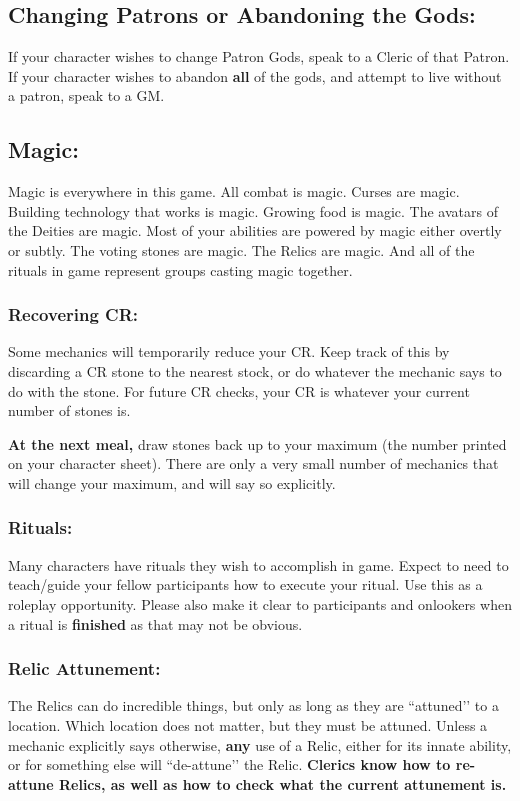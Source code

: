 \documentclass[sheet]{GL2020}
\begin{document}
\subsection{Changing Patrons or Abandoning the Gods:}
If your character wishes to change Patron Gods, speak to a Cleric of that Patron. If your character wishes to abandon \textbf{all} of the gods, and attempt to live without a patron, speak to a GM.

\subsection{Magic:}
{Magic is everywhere in this game. All combat is magic. Curses are magic. Building technology that works is magic. Growing food is magic. The avatars of the Deities are magic. Most of your abilities are powered by magic either overtly or subtly. The voting stones are magic. The Relics are magic. And all of the rituals in game represent groups casting magic together.

\subsubsection{Recovering CR:}
Some mechanics will temporarily reduce your CR. Keep track of this by discarding a CR stone to the nearest stock, or do whatever the mechanic says to do with the stone. For future CR checks, your CR is whatever your current number of stones is.

\textbf{At the next meal,} draw stones back up to your maximum (the number printed on your character sheet). There are only a very small number of mechanics that will change your maximum, and will say so explicitly.

\subsubsection{Rituals:}
Many characters have rituals they wish to accomplish in game. Expect to need to teach/guide your fellow participants how to execute your ritual. Use this as a roleplay opportunity. Please also make it clear to participants and onlookers when a ritual is \textbf{finished} as that may not be obvious.

\subsubsection{Relic Attunement:}
The Relics can do incredible things, but only as long as they are ``attuned’’ to a location. Which location does not matter, but they must be attuned. Unless a mechanic explicitly says otherwise, \textbf{any} use of a Relic, either for its innate ability, or for something else will ``de-attune’’ the Relic. \textbf{Clerics know how to re-attune Relics, as well as how to check what the current attunement is.}

}
\end{document}
